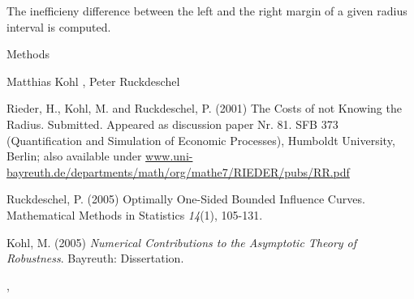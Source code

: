 \begin{Value}
The inefficieny difference between the left and
the right margin of a given radius interval is computed.
\end{Value}
\begin{Section}{Methods}
\end{Section}
\begin{Author}\relax
Matthias Kohl ,
Peter Ruckdeschel 
\end{Author}
\begin{References}\relax
Rieder, H., Kohl, M. and Ruckdeschel, P. (2001) The Costs of not Knowing
the Radius. Submitted. Appeared as discussion paper Nr. 81. 
SFB 373 (Quantification and Simulation of Economic Processes),
Humboldt University, Berlin; also available under
\url{www.uni-bayreuth.de/departments/math/org/mathe7/RIEDER/pubs/RR.pdf}

Ruckdeschel, P. (2005) Optimally One-Sided Bounded Influence Curves.
Mathematical Methods in Statistics \emph{14}(1), 105-131.

Kohl, M. (2005) \emph{Numerical Contributions to the Asymptotic Theory of Robustness}. 
Bayreuth: Dissertation.
\end{References}
\begin{SeeAlso}\relax
{}, 
\end{SeeAlso}

